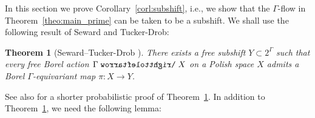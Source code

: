 \documentclass[11pt,reqno,psamsfonts]{amsart}
\theoremstyle{bfnote}
\newtheorem{theo}{Theorem}[section]
\theoremstyle{definition}
\theoremstyle{remark}
\newcommand{\0}{\varnothing}
\newcommand{\acts}{\mathrel{\reflectbox{$\righttoleftarrow$}}}
\newcommand{\G}{\Gamma}
\numberwithin{equation}{section}
\begin{document}

    In this section we prove Corollary~\ref{corl:subshift}, i.e., we show that the $\G$-flow in Theorem~\ref{theo:main_prime} can be taken to be a subshift. %
    We shall use the following result of Seward and Tucker-Drob:

    \begin{theo}[{Seward--Tucker-Drob \cite{ST-D}}]\label{theo:ST-D}
        There exists a free subshift $Y \subset 2^\G$ such that every free Borel action $\G \acts X$ on a Polish space $X$ admits a Borel $\G$-equivariant map $\pi \colon X \to Y$.
    \end{theo}

    See also \cite{Ber_cont} for a shorter probabilistic proof of Theorem~\ref{theo:ST-D}. In addition to Theorem~\ref{theo:ST-D}, we need the following lemma:
\end{document}
